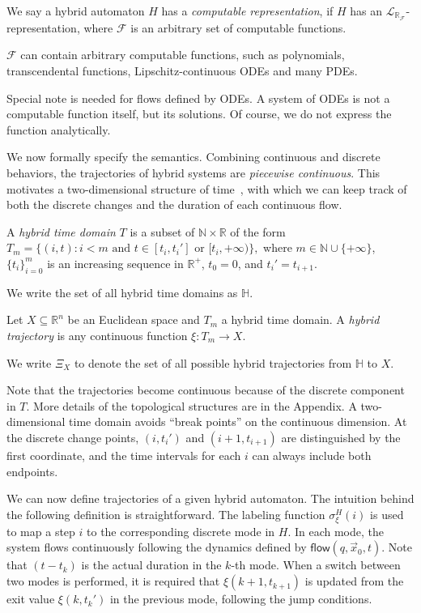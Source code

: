\documentclass[envcountsect]{llncs}
\newcommand{\flow}{\mathsf{flow}}
\newcommand{\lrf}{\mathcal{L}_{\mathbb{R}_{\mathcal{F}}}}
\begin{document}
\begin{definition}
We say a hybrid automaton $H$ has a {\em computable representation}, if $H$ has
an $\lrf$-representation, where $\mathcal{F}$ is an arbitrary set of computable
functions.
\end{definition}
$\mathcal{F}$ can contain arbitrary computable functions, such as
polynomials, transcendental functions, Lipschitz-continuous ODEs and many PDEs.
\begin{remark}[{\bf todo}]
Special note is needed for flows defined by ODEs. A system of ODEs is not a
computable function itself, but its solutions. Of course, we do not express the
function analytically. 
\end{remark}

We now formally specify the semantics. Combining continuous and discrete
behaviors, the trajectories of hybrid systems are {\em piecewise continuous}.
This motivates a two-dimensional structure of time~\cite{}, with which we can
keep track of both the discrete changes and the duration of each continuous
flow.
\begin{definition}
A {\em hybrid time domain} $T$ is a subset of
 $\mathbb{N}\times \mathbb{R}$ of the form
$T_m=\{(i, t): i<m \mbox{ and } t\in [t_i, t_i']\mbox{ or }[t_i, +\infty)\},$
where $m\in \mathbb{N}\cup\{+\infty\}$, $\{t_i\}_{i=0}^m$ is an
increasing sequence in $\mathbb{R}^+$, $t_0= 0$, and $t_i'=t_{i+1}$.
\end{definition}
We write the set of all hybrid time domains as $\mathbb{H}$.
\begin{definition}
Let $X\subseteq\mathbb{R}^n$ be an Euclidean space and $T_m$ a hybrid
time domain. A {\em hybrid trajectory} is any continuous function $\xi: T_m
\rightarrow X.$
 \end{definition}
We write $\Xi_X$ to denote the set of all possible hybrid trajectories from
$\mathbb{H}$ to $X$.
 \begin{remark}
Note that the trajectories become continuous because of the discrete component
in $T$. More details of the topological structures are in the
Appendix. A two-dimensional time domain avoids ``break points'' on the
continuous dimension. At the discrete change points, $(i,t_i')$ and $(i+1,
t_{i+1})$ are distinguished by the first coordinate, and the time intervals for
each $i$ can
always include both endpoints.
\end{remark}

We can now define trajectories of a given hybrid automaton. The intuition behind
the following definition is straightforward. The labeling function
$\sigma_{\xi}^H(i)$ is used to map a step $i$ to the corresponding discrete mode
in $H$. In each mode, the system flows continuously following the dynamics
defined by $\flow(q, \vec x_0, t)$. Note that $(t-t_k)$ is the actual duration
in the $k$-th mode. When a switch between two modes is performed, it is required
that $\xi(k+1, t_{k+1})$ is updated from the exit value $\xi(k, t_k')$ in the
previous mode, following the jump conditions.
\end{document}
